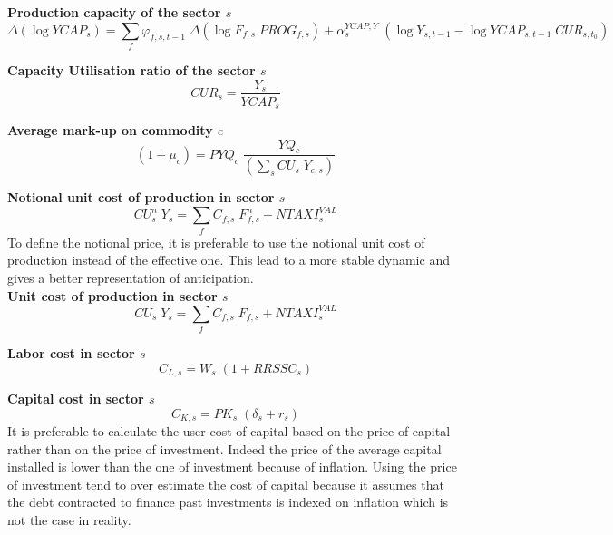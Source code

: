 \documentclass[12pt]{article}
\numberwithin{equation}{section}
\begin{document}
\noindent\textbf{Production capacity of the sector $s$} \\
\begin{dmath}
\varDelta \left(\operatorname{log} YCAP_{s}\right) = \sum_{f} \varphi_{f, s, t-1} \; \varDelta \left(\operatorname{log} F_{f, s} \; PROG_{f, s}\right) + \alpha^{YCAP,Y}_{s} \; \left( \operatorname{log} Y_{s, t-1} - \operatorname{log} YCAP_{s, t-1} \; CUR_{s, t_{0}} \right)
\end{dmath}

\noindent\textbf{Capacity Utilisation ratio of the sector $s$} \\
\begin{dmath}
CUR_{s} = \frac{Y_{s}}{YCAP_{s}}
\end{dmath}

\noindent\textbf{Average mark-up on commodity $c$} \\
\begin{dmath}
\left( 1 + \mu_{c} \right) = PYQ_{c} \; \frac{YQ_{c}}{\left( \sum_{s} CU_{s} \; Y_{c, s} \right)}
\end{dmath}

\noindent\textbf{Notional unit cost of production in sector $s$} \\
\begin{dmath}
CU^{n}_{s} \; Y_{s} = \sum_{f} C_{f, s} \; F^{n}_{f, s} + NTAXI^{VAL}_{s}
\end{dmath}
To define the notional price, it is preferable to use the notional unit cost of production instead of the effective one. This lead to a more stable dynamic and gives a better representation of anticipation. \\

\noindent\textbf{Unit cost of production in sector $s$} \\
\begin{dmath}
CU_{s} \; Y_{s} = \sum_{f} C_{f, s} \; F_{f, s} + NTAXI^{VAL}_{s}
\end{dmath}

\noindent\textbf{Labor cost in sector $s$} \\
\begin{dmath}
C_{L, s} = W_{s} \; \left( 1 + RRSSC_{s} \right)
\end{dmath}


\noindent\textbf{Capital cost in sector $s$} \\
\begin{dmath}
C_{K, s} = PK_{s} \; \left( \delta_{s} + r_{s} \right)
\end{dmath}
It is preferable to calculate the user cost of capital based on the price of capital rather than on the price of investment. Indeed the price of the average capital installed is lower than the one of investment because of inflation. Using the price of investment tend to over estimate the cost of capital because it assumes that the debt contracted to finance past investments is indexed on inflation which is not the case in reality. \\
\end{document}

